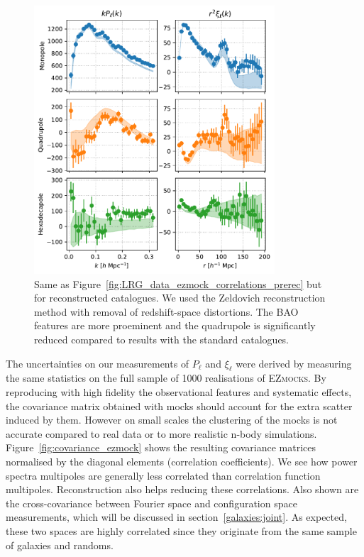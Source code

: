 \begin{figure}
    \centering
    \includegraphics[width=0.8\textwidth]{fig/galaxies/DR16LRG_data_ezmock_postrecon.pdf}
    \caption{Same as Figure~\ref{fig:LRG_data_ezmock_correlations_prerec} but for reconstructed 
    catalogues. We used the Zeldovich reconstruction method with removal of redshift-space distortions. 
    The BAO features are more proeminent and the quadrupole is significantly reduced compared 
    to results with the standard catalogues.    
    }
    \label{fig:LRG_data_ezmock_correlations_postrec}
\end{figure}

The uncertainties on our measurements of $P_\ell$ and $\xi_\ell$ were derived by measuring the 
same statistics on the full sample of 1000 realisations of \textsc{EZmocks}. By reproducing with 
high fidelity the observational features and systematic effects, the covariance matrix obtained 
with mocks should account for the extra scatter induced by them. However on small scales the 
clustering of the mocks is not accurate compared to real data or to more realistic n-body simulations. 
Figure~\ref{fig:covariance_ezmock} shows the resulting covariance matrices normalised by the 
diagonal elements (correlation coefficients). We see how power spectra multipoles are generally 
less correlated than correlation function multipoles. Reconstruction also helps reducing these 
correlations. Also shown are the cross-covariance between Fourier space and configuration space 
measurements, which will be discussed in section~\ref{galaxies:joint}. As expected, these
two spaces are highly correlated since they originate from the same sample of galaxies and randoms. 

